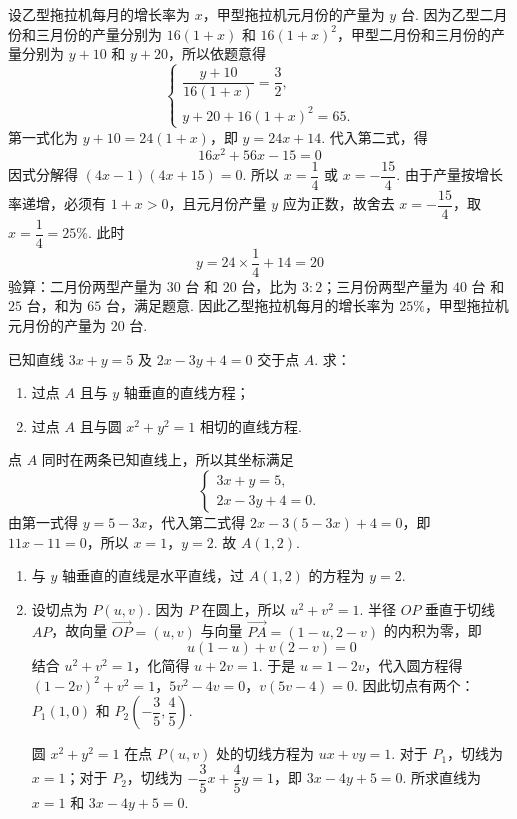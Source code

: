 \begin{solution}
设乙型拖拉机每月的增长率为 \(x\)，甲型拖拉机元月份的产量为 \(y\text{ 台}\). 因为乙型二月份和三月份的产量分别为 \(16\left(1+x\right)\) 和 \(16\left(1+x\right)^2\)，甲型二月份和三月份的产量分别为 \(y+10\) 和 \(y+20\)，所以依题意得
\[
\begin{cases}
\dfrac{y+10}{16\left(1+x\right)}=\dfrac32,\\
y+20+16\left(1+x\right)^2=65.
\end{cases}
\]
第一式化为 \(y+10=24\left(1+x\right)\)，即 \(y=24x+14\). 代入第二式，得
\[
16x^2+56x-15=0
\]
因式分解得 \(\left(4x-1\right)\left(4x+15\right)=0\).
所以 \(x=\dfrac14\) 或 \(x=-\dfrac{15}{4}\). 由于产量按增长率递增，必须有 \(1+x>0\)，且元月份产量 \(y\) 应为正数，故舍去 \(x=-\dfrac{15}{4}\)，取 \(x=\dfrac14=25\%\). 此时
\[
y=24\times\frac14+14=20
\]
验算：二月份两型产量为 \(30\text{ 台}\) 和 \(20\text{ 台}\)，比为 \(3:2\)；三月份两型产量为 \(40\text{ 台}\) 和 \(25\text{ 台}\)，和为 \(65\text{ 台}\)，满足题意. 因此乙型拖拉机每月的增长率为 \(25\%\)，甲型拖拉机元月份的产量为 \(20\text{ 台}\).
\end{solution}

\begin{problem}
已知直线 \(3x+y=5\) 及 \(2x-3y+4=0\) 交于点 \(A\). 求：
\begin{enumerate}
\item 过点 \(A\) 且与 \(y\) 轴垂直的直线方程；
\item 过点 \(A\) 且与圆 \(x^2+y^2=1\) 相切的直线方程.
\end{enumerate}
\end{problem}

\begin{solution}
点 \(A\) 同时在两条已知直线上，所以其坐标满足
\[
\begin{cases}
3x+y=5,\\
2x-3y+4=0.
\end{cases}
\]
由第一式得 \(y=5-3x\)，代入第二式得 \(2x-3\left(5-3x\right)+4=0\)，即 \(11x-11=0\)，所以 \(x=1\)，\(y=2\). 故 \(A\left(1,2\right)\).

\begin{enumerate}
\item 与 \(y\) 轴垂直的直线是水平直线，过 \(A\left(1,2\right)\) 的方程为 \(y=2\).

\item 设切点为 \(P\left(u,v\right)\). 因为 \(P\) 在圆上，所以 \(u^2+v^2=1\). 半径 \(OP\) 垂直于切线 \(AP\)，故向量 \(\overrightarrow{OP}=\left(u,v\right)\) 与向量 \(\overrightarrow{PA}=\left(1-u,2-v\right)\) 的内积为零，即
\[
u(1-u)+v(2-v)=0
\]
结合 \(u^2+v^2=1\)，化简得 \(u+2v=1\). 于是 \(u=1-2v\)，代入圆方程得
\(\left(1-2v\right)^2+v^2=1\)，\(5v^2-4v=0\)，\(v\left(5v-4\right)=0\).
因此切点有两个：\(P_1\left(1,0\right)\) 和 \(P_2\left(-\dfrac35,\dfrac45\right)\).

圆 \(x^2+y^2=1\) 在点 \(P\left(u,v\right)\) 处的切线方程为 \(ux+vy=1\). 对于 \(P_1\)，切线为 \(x=1\)；对于 \(P_2\)，切线为 \(-\dfrac35x+\dfrac45y=1\)，即 \(3x-4y+5=0\). 所求直线为 \(x=1\) 和 \(3x-4y+5=0\).
\end{enumerate}
\end{solution}

